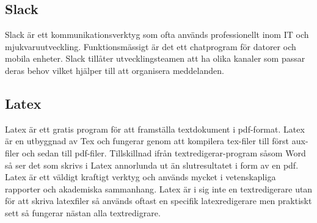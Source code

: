 \subsection*{Slack}
Slack \cite{Slack} är ett kommunikationsverktyg som ofta används professionellt inom IT och mjukvaruutveckling. Funktionsmässigt är det ett chatprogram för datorer och mobila enheter. Slack tillåter utvecklingsteamen att ha olika kanaler som passar deras behov vilket hjälper till att organisera meddelanden.

\subsection*{Latex}
Latex är ett gratis program för att framställa textdokument i pdf-format. Latex är en utbyggnad av Tex och fungerar genom att kompilera tex-filer till först aux-filer och sedan till pdf-filer. Tillskillnad ifrån textredigerar-program såsom Word så ser det som skrivs i Latex annorlunda ut än slutresultatet i form av en pdf. Latex är ett väldigt kraftigt verktyg och används mycket i vetenskapliga rapporter och akademiska sammanhang\cite{ctan}. Latex är i sig inte en textredigerare utan för att skriva latexfiler så används oftast en specifik latexredigerare men praktiskt sett så fungerar nästan alla textredigrare.